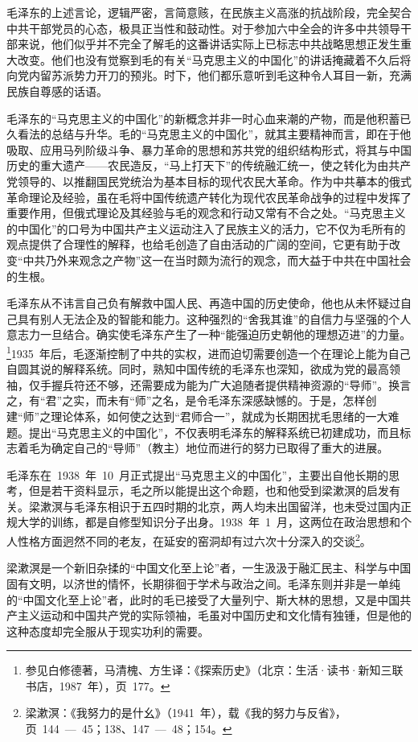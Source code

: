 毛泽东的上述言论，逻辑严密，言简意赅，在民族主义高涨的抗战阶段，完全契合中共干部党员的心态，极具正当性和鼓动性。对于参加六中全会的许多中共领导干部来说，他们似乎并不完全了解毛的这番讲话实际上已标志中共战略思想正发生重大改变。他们也没有觉察到毛的有关“马克思主义的中国化”的讲话掩藏着不久后将向党内留苏派势力开刀的预兆。时下，他们都乐意听到毛这种令人耳目一新，充满民族自尊感的话语。

毛泽东的“马克思主义的中国化”的新概念并非一时心血来潮的产物，而是他积蓄已久看法的总结与升华。毛的“马克思主义的中国化”，就其主要精神而言，即在于他吸取、应用马列阶级斗争、暴力革命的思想和苏共党的组织结构形式，将其与中国历史的重大遗产——农民造反，“马上打天下”的传统融汇统一，使之转化为由共产党领导的、以推翻国民党统治为基本目标的现代农民大革命。作为中共摹本的俄式革命理论及经验，虽在毛将中国传统遗产转化为现代农民革命战争的过程中发挥了重要作用，但俄式理论及其经验与毛的观念和行动又常有不合之处。“马克思主义的中国化”的口号为中国共产主义运动注入了民族主义的活力，它不仅为毛所有的观点提供了合理性的解释，也给毛创造了自由活动的广阔的空间，它更有助于改变“中共乃外来观念之产物”这一在当时颇为流行的观念，而大益于中共在中国社会的生根。

毛泽东从不讳言自己负有解救中国人民、再造中国的历史使命，他也从未怀疑过自己具有别人无法企及的智能和能力。这种强烈的“舍我其谁”的自信力与坚强的个人意志力一旦结合。确实使毛泽东产生了一种“能强迫历史朝他的理想迈进”的力量。\footnote{参见白修德著，马清槐、方生译：《探索历史》（北京：生活·读书·新知三联书店，1987~年），页~177。}1935~年后，毛逐渐控制了中共的实权，进而迫切需要创造一个在理论上能为自己自圆其说的解释系统。同时，熟知中国传统的毛泽东也深知，欲成为党的最高领袖，仅手握兵符还不够，还需要成为能为广大追随者提供精神资源的“导师”。换言之，有“君”之实，而未有“师”之名，是令毛泽东深感缺憾的。于是，怎样创建“师”之理论体系，如何使之达到“君师合一”，就成为长期困扰毛思绪的一大难题。提出“马克思主义的中国化”，不仅表明毛泽东的解释系统已初建成功，而且标志着毛为确定自己的“导师”（教主）地位而进行的努力已取得了重大的进展。

毛泽东在~1938~年~10~月正式提出“马克思主义的中国化”，主要出自他长期的思考，但是若干资料显示，毛之所以能提出这个命题，也和他受到梁漱溟的启发有关。梁漱溟与毛泽东相识于五四时期的北京，两人均未出国留洋，也未受过国内正规大学的训练，都是自修型知识分子出身。1938~年~1~月，这两位在政治思想和个人性格方面迥然不同的老友，在延安的窑洞却有过六次十分深入的交谈\footnote{梁漱溟：《我努力的是什幺》（1941~年），载《我的努力与反省》，页~144~—~45；138、147~—~48；154。}。

梁漱溟是一个新旧杂揉的“中国文化至上论”者，一生汲汲于融汇民主、科学与中国固有文明，以济世的情怀，长期徘徊于学术与政治之间。毛泽东则并非是一单纯的“中国文化至上论”者，此时的毛已接受了大量列宁、斯大林的思想，又是中国共产主义运动和中国共产党的实际领袖，毛虽对中国历史和文化情有独锺，但是他的这种态度却完全服从于现实功利的需要。

